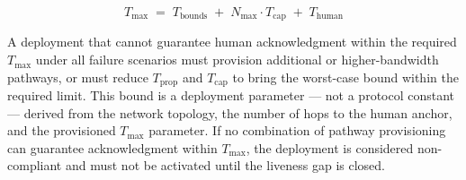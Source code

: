 \begin{equation}
T_{\max} \;=\; T_{\text{bounds}} \;+\; N_{\max} \cdot T_{\text{cap}} \;+\; T_{\text{human}} \tag{T-max}
\end{equation}

A deployment that cannot guarantee human acknowledgment within the required $T_{\max}$ under all failure scenarios must provision additional or higher-bandwidth pathways, or must reduce $T_{\text{prop}}$ and $T_{\text{cap}}$ to bring the worst-case bound within the required limit. This bound is a deployment parameter — not a protocol constant — derived from the network topology, the number of hops to the human anchor, and the provisioned $T_{\max}$ parameter. If no combination of pathway provisioning can guarantee acknowledgment within $T_{\max}$, the deployment is considered non-compliant and must not be activated until the liveness gap is closed.